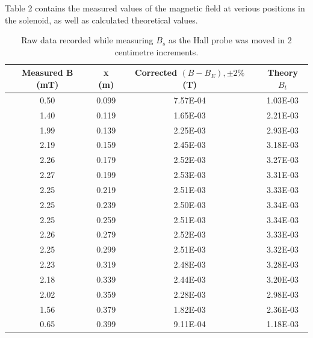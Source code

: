 \documentclass[letterpaper]{article}
\begin{document}
Table 2 contains the measured values of the magnetic field at verious
positions in the solenoid, as well as calculated theoretical values.

\begin{table}[]
\centering
\begin{tabular}{|c|c|c|c|}
\hline
Measured B (mT) & x (m) & Corrected  $(B - B_E),\pm 2\%$ (T) & Theory $B_t$ \\ \hline
0.50            & 0.099 & 7.57E-04                           & 1.03E-03     \\ \hline
1.40            & 0.119 & 1.65E-03                           & 2.21E-03     \\ \hline
1.99            & 0.139 & 2.25E-03                           & 2.93E-03     \\ \hline
2.19            & 0.159 & 2.45E-03                           & 3.18E-03     \\ \hline
2.26            & 0.179 & 2.52E-03                           & 3.27E-03     \\ \hline
2.27            & 0.199 & 2.53E-03                           & 3.31E-03     \\ \hline
2.25            & 0.219 & 2.51E-03                           & 3.33E-03     \\ \hline
2.25            & 0.239 & 2.50E-03                           & 3.34E-03     \\ \hline
2.25            & 0.259 & 2.51E-03                           & 3.34E-03     \\ \hline
2.26            & 0.279 & 2.52E-03                           & 3.33E-03     \\ \hline
2.25            & 0.299 & 2.51E-03                           & 3.32E-03     \\ \hline
2.23            & 0.319 & 2.48E-03                           & 3.28E-03     \\ \hline
2.18            & 0.339 & 2.44E-03                           & 3.20E-03     \\ \hline
2.02            & 0.359 & 2.28E-03                           & 2.98E-03     \\ \hline
1.56            & 0.379 & 1.82E-03                           & 2.36E-03     \\ \hline
0.65            & 0.399 & 9.11E-04                           & 1.18E-03     \\ \hline
\end{tabular}
\caption{Raw data recorded while measuring $B_s$ as the Hall probe was moved in 2 centimetre increments.}
\end{table}
\end{document}
